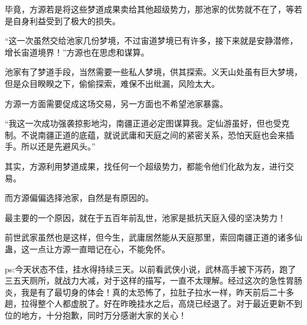 \begin{this_body}
毕竟，方源若是将这些梦道成果卖给其他超级势力，那池家的优势就不在了，等若是自身利益受到了极大的损失。

“这一次虽然交给池家几份梦境，不过宙道梦境已有许多，接下来就是安静潜修，增长宙道境界！”方源也在思虑和谋算。

池家有了梦道手段，当然需要一些私人梦境，供其探索。义天山处虽有巨大梦境，但是众目睽睽之下，偷偷探索，难保不出纰漏，风险太大。

方源一方面需要促成这场交易，另一方面也不希望池家暴露。

“我这一次成功强袭掠影地沟，南疆正道必定图谋算我。定仙游虽好，但也受克制。不说南疆正道的底蕴，就说武庸和天庭之间的紧密关系，恐怕天庭也会来插手。所以还是先避风头。”

其实，方源利用梦道成果，找任何一个超级势力，都能令他们化敌为友，进行交易。

而方源偏偏选择池家，自然是有原因的。

最主要的一个原因，就在于五百年前乱世，池家是抵抗天庭入侵的坚决势力！

前世武家虽然也是这样，但今生，武庸居然能从天庭那里，索回南疆正道的诸多仙蛊，这一点让方源一直暗记在心，不能免怀。

ps:今天状态不佳，挂水得持续三天。以前看武侠小说，武林高手被下泻药，跑了三五天厕所，就战力大减，对于这样的描写，一直不太理解。经过这次的急性胃肠炎，我是有了最切身的体会！真的太恐怖了，拉肚子拉水一样，昨天前后二十多趟，拉得整个人都虚脱了。好在昨晚挂水之后，高烧已经退了。对于最近更新不到位的地方，十分抱歉，同时万分感谢大家的关心！

\end{this_body}

